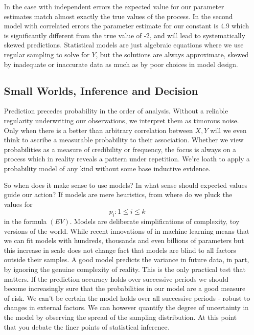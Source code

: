 \documentclass[10pt,a4paper,notitlepage, twocolumn]{article}
\begin{document}
In the case with independent errors the expected value for our parameter estimates match almost exactly the true values of the process. In the second model with correlated errors the parameter estimate for our constant is 4.9 which is significantly different from the true value of -2, and will lead to systematically skewed predictions. Statistical models are just algebraic equations where we use regular sampling to solve for $Y$, but the solutions are always approximate, skewed by inadequate or inaccurate data as much as by poor choices in model design. 

\subsection*{Small Worlds, Inference and Decision}
Prediction precedes probability in the order of analysis. Without a reliable regularity underwriting our observations, we interpret them as timorous noise. Only when there is a better than arbitrary correlation between $X, Y$ will we even think to ascribe a measurable probability to their association. Whether we view probabilities as a measure of credibility or frequency, the focus is always on a process which in reality reveals a pattern under repetition. We're loath to apply a probability model of any kind without some base inductive evidence.
\newline 

\noindent So when does it make sense to use models? In what sense should expected values guide our action? If models are mere heuristics, from where do we pluck the values for $$p_{i} : 1 \leq i \leq k$$ in the formula $(EV)$. Models are deliberate simplifications of complexity, toy versions of the world. While recent innovations of in machine learning means that we can fit models with hundreds, thousands and even billions of parameters but this increase in scale does not change fact that models are blind to all factors outside their samples. A good model predicts the variance in future data, in part, by ignoring the genuine complexity of reality. This is the only practical test that matters. If the prediction accuracy holds over successive periods we should become increasingly sure that the probabilities in our model are a good measure of risk. We can't be certain the model holds over all successive periods - robust to changes in external factors. We can however quantify the degree of uncertainty in the model by observing the spread of the sampling distribution. At this point that you debate the finer points of statistical inference. 
\end{document}
